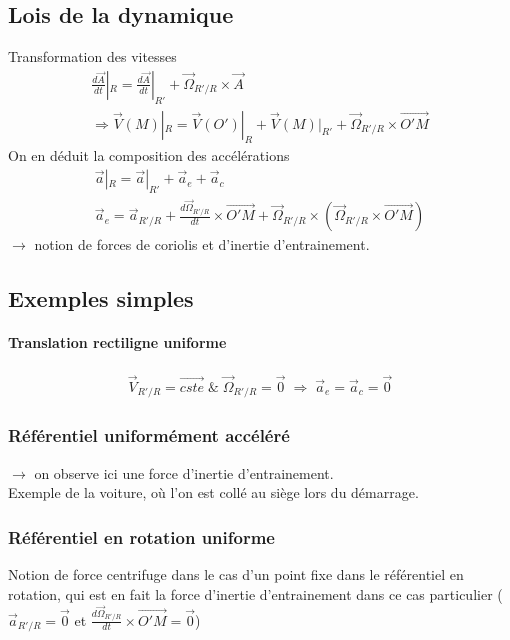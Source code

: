 \documentclass[12pt,prb,aps,epsf]{report}
\begin{document}
\subsection{Lois de la dynamique}

Transformation des vitesses
\begin{eqnarray}
\frac{d\vec{A}}{dt}|_R = \frac{d\vec{A}}{dt}|_{R'}  + \vec{\Omega}_{R'/R}\times \vec{A}\\
\Rightarrow \vec{V}(M)|_R = \vec{V}(O')|_R + \vec{V}(M)|_{R'}+ \vec{\Omega}_{R'/R}\times \vec{O'M}
\end{eqnarray}
On en déduit la composition des accélérations 
\begin{eqnarray}
\vec{a}|_R = \vec{a}|_{R'} + \vec{a}_e + \vec{a}_c\\
\vec{a}_e = \vec{a}_{R'/R} + \frac{d\vec{\Omega}_{R'/R}}{dt}\times \vec{O'M} + \vec{\Omega}_{R'/R} \times (\vec{\Omega}_{R'/R} \times \vec{O'M})
\end{eqnarray}
$\rightarrow$ notion de forces de coriolis et d'inertie d'entrainement.

\subsection{Exemples simples}
\paragraph{Translation rectiligne uniforme}
\begin{eqnarray}
\vec{V}_{R'/R} = \vec{cste} \; \& \; \vec{\Omega}_{R'/R} = \vec{0}\; \Rightarrow \; \vec{a}_e = \vec{a}_c = \vec{0}
\end{eqnarray}
\subsubsection*{Référentiel uniformément accéléré}
$\rightarrow$ on observe ici une force d'inertie d'entrainement.\\
Exemple de la voiture, où l'on est collé au siège lors du démarrage.

\subsubsection*{Référentiel en rotation uniforme}
Notion de force centrifuge dans le cas d'un point fixe dans le référentiel en rotation, qui est en fait la force d'inertie d'entrainement dans ce cas particulier ($\vec{a}_{R'/R}=\vec{0}$ et $ \frac{d\vec{\Omega}_{R'/R}}{dt}\times \vec{O'M}=\vec{0}$)
\end{document}
